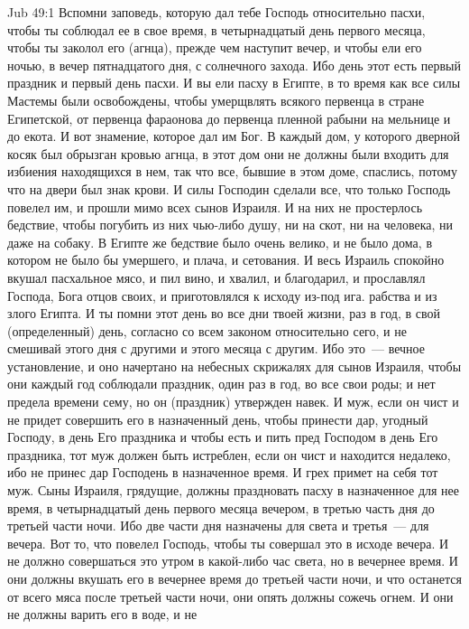 \vs Jub 49:1
Вспомни заповедь, которую дал тебе Господь
относительно пасхи, чтобы ты соблюдал ее в свое
время, в четырнадцатый день первого месяца, чтобы
ты заколол его (агнца), прежде чем наступит вечер,
и чтобы ели его ночью, в вечер пятнадцатого дня, с
солнечного захода. Ибо день этот есть первый
праздник и первый день пасхи. И вы ели пасху в
Египте, в то время как все силы Мастемы были
освобождены, чтобы умерщвлять всякого первенца в
стране Египетской, от первенца фараонова до
первенца пленной рабыни на мельнице и до екота. И
вот знамение, которое дал им Бог. В каждый дом, у
которого дверной косяк был обрызган кровью
агнца, в этот дом они не должны были входить для
избиения находящихся в нем, так что все, бывшие в
этом доме, спаслись, потому что на двери был знак
крови. И силы Господин сделали все, что только
Господь повелел им, и прошли мимо всех сынов
Израиля. И на них не простерлось бедствие, чтобы
погубить из них чью-либо душу, ни на скот, ни на
человека, ни даже на собаку. В Египте же бедствие
было очень велико, и не было дома, в котором не
было бы умершего, и плача, и сетования. И весь
Израиль спокойно вкушал пасхальное мясо, и пил
вино, и хвалил, и благодарил, и прославлял
Господа, Бога отцов своих, и приготовлялся к
исходу из-под ига. рабства и из злого Египта. И ты
помни этот день во все дни твоей жизни, раз в год,
в свой (определенный) день, согласно со всем
законом относительно сего, и не смешивай этого
дня с другими и этого месяца с другим. Ибо это~---
вечное установление, и оно начертано на небесных
скрижалях для сынов Израиля, чтобы они каждый год
соблюдали праздник, один раз в год, во все свои
роды; и нет предела времени сему, но он (праздник)
утвержден навек. И муж, если он чист и не придет
совершить его в назначенный день, чтобы принести
дар, угодный Господу, в день Его праздника и чтобы
есть и пить пред Господом в день Его праздника,
тот муж должен быть истреблен, если он чист и
находится недалеко, ибо не принес дар Господень в
назначенное время. И грех примет на себя тот муж.
Сыны Израиля, грядущие, должны праздновать пасху
в назначенное для нее время, в четырнадцатый день
первого месяца вечером, в третью часть дня до
третьей части ночи. Ибо две части дня назначены
для света и третья~--- для вечера. Вот то, что
повелел Господь, чтобы ты совершал это в исходе
вечера. И не должно совершаться это утром в
какой-либо час света, но в вечернее время. И они
должны вкушать его в вечернее время до третьей
части ночи, и что останется от всего мяса после
третьей части ночи, они опять должны сожечь
огнем. И они не должны варить его в воде, и не
